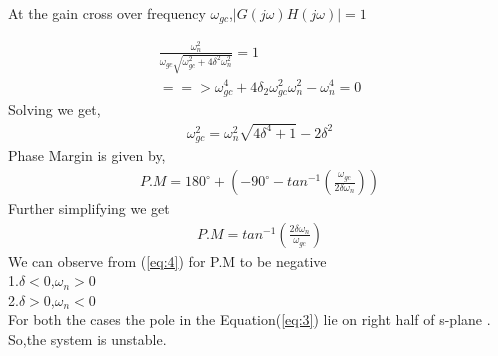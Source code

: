 \begin{enumerate}[label=\thesection.\arabic*.,ref=\thesection.\theenumi]
At the gain cross over frequency $\omega_{gc}$,$|G(j\omega)H(j\omega)|=1$ 

\begin{align}
\frac{\omega_{n}^{2}}{\omega_{gc}\sqrt{\omega_{gc}^{2}+4\delta^{2}\omega_{n}^{2}}} =1 
\\
==> \omega_{gc}^{4} +4 \delta_{2} \omega_{gc}^{2} \omega_{n}^{2}-\omega_{n}^{4}=0
\end{align}
Solving we get,
\begin{align}
\omega_{gc}^{2}=\omega_{n}^{2} \sqrt{4\delta^{4}+1} - 2 \delta^{2}
\end{align}
Phase Margin is given by,
\begin{align}
P.M=180^{\circ}+(-90^{\circ}-tan^{-1}(\frac{\omega_{gc}}{2\delta \omega_{n}}))
\end{align}
Further simplifying we get
\begin{align}
P.M=tan^{-1}(\frac{2\delta \omega_{n}}{\omega_{gc}}) \label{eq:4}
\end{align}
We can observe from (\ref{eq:4}) for P.M to be negative \\
1.$\delta <0$,$\omega_{n} >0$  \\
2.$\delta >0$,$\omega_{n} <0$   \\
For both the cases the pole in the Equation(\ref{eq:3}) lie on right half of s-plane . So,the system is unstable.











\end{enumerate}
